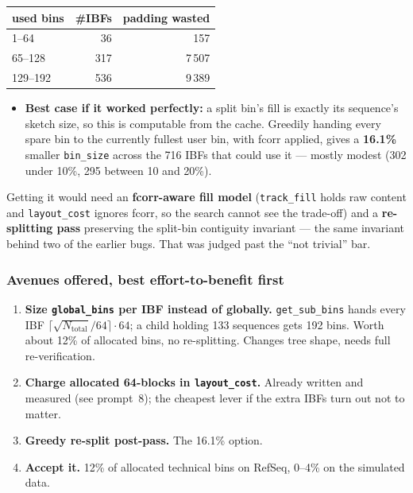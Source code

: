 \documentclass[11pt,a4paper]{article}
\newcommand{\code}[1]{\lstinline[basicstyle=\ttfamily\small]!#1!}
\begin{document}
\begin{longtable}{@{}lrr@{}}
\toprule
\textbf{used bins} & \textbf{\#IBFs} & \textbf{padding wasted} \\
\midrule
1--64    &  36 &   157 \\
65--128  & 317 & 7\,507 \\
129--192 & 536 & 9\,389 \\
\bottomrule
\end{longtable}

\begin{itemize}[leftmargin=*]
\item \textbf{Best case if it worked perfectly:} a split bin's fill is exactly its sequence's sketch
size, so this is computable from the cache. Greedily handing every spare bin to the currently
fullest user bin, with fcorr applied, gives a \textbf{16.1\%} smaller \code{bin_size} across the 716
IBFs that could use it --- mostly modest (302 under 10\%, 295 between 10 and 20\%).
\end{itemize}

\noindent Getting it would need an \textbf{fcorr-aware fill model} (\code{track_fill} holds raw
content and \code{layout_cost} ignores fcorr, so the search cannot see the trade-off) and a
\textbf{re-splitting pass} preserving the split-bin contiguity invariant --- the same invariant
behind two of the earlier bugs. That was judged past the ``not trivial'' bar.

\subsubsection*{Avenues offered, best effort-to-benefit first}

\begin{enumerate}[leftmargin=*]
\item \textbf{Size \code{global_bins} per IBF instead of globally.} \code{get_sub_bins} hands every
IBF $\lceil \sqrt{N_{\text{total}}}/64 \rceil \cdot 64$; a child holding 133 sequences gets 192
bins. Worth about 12\% of allocated bins, no re-splitting. Changes tree shape, needs full
re-verification.
\item \textbf{Charge allocated 64-blocks in \code{layout_cost}.} Already written and measured (see
prompt~8); the cheapest lever if the extra IBFs turn out not to matter.
\item \textbf{Greedy re-split post-pass.} The 16.1\% option.
\item \textbf{Accept it.} 12\% of allocated technical bins on RefSeq, 0--4\% on the simulated data.
\end{enumerate}
\end{document}
